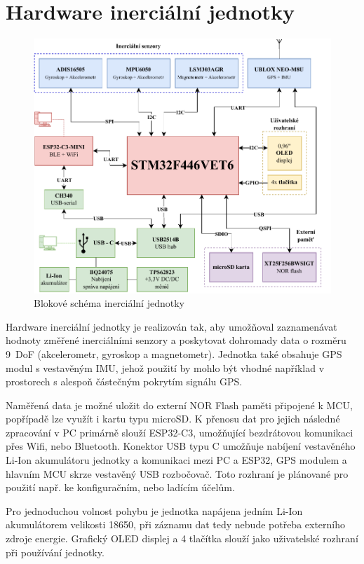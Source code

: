 \chapter{Hardware inerciální jednotky}

\begin{figure}[h]
    \centering
    \includegraphics[width=\textwidth]{obrazky/IMUnav_H00_block}
    \caption{Blokové schéma inerciální jednotky}
\end{figure}

Hardware inerciální jednotky je realizován tak, aby umožňoval zaznamenávat hodnoty změřené inerciálními senzory a poskytovat dohromady data o rozměru 9~DoF (akcelerometr, gyroskop a magnetometr). Jednotka také obsahuje GPS modul s vestavěným IMU, jehož použití by mohlo být vhodné například v prostorech s alespoň částečným pokrytím signálu GPS.

Naměřená data je možné uložit do externí NOR Flash paměti připojené k MCU, popřípadě lze využít i kartu typu microSD. K přenosu dat pro jejich následné zpracování v PC primárně slouží ESP32-C3, umožňující bezdrátovou komunikaci přes Wifi, nebo Bluetooth. Konektor USB typu C umožňuje nabíjení vestavěného Li-Ion akumulátoru jednotky a komunikaci mezi PC a ESP32, GPS modulem a hlavním MCU skrze vestavěný USB rozbočovač. Toto rozhraní je plánované pro použití např. ke konfiguračním, nebo ladícím účelům.

Pro jednoduchou volnost pohybu je jednotka napájena jedním Li-Ion akumulátorem velikosti 18650, při záznamu dat tedy nebude potřeba externího zdroje energie. Grafický OLED displej a 4 tlačítka slouží jako uživatelské rozhraní při používání jednotky.

